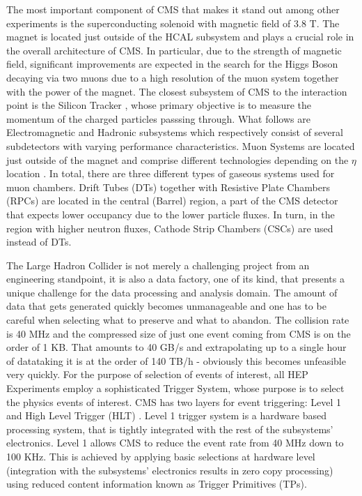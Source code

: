 The most important component of CMS that makes it stand out among other experiments is the superconducting solenoid with magnetic field of 3.8 T. The magnet is located just outside of the HCAL subsystem and plays a crucial role in the overall architecture of CMS. In particular, due to the strength of magnetic field, significant improvements are expected in the search for the Higgs Boson decaying via two muons due to a high resolution of the muon system together with the power of the magnet. The closest subsystem of CMS to the interaction point is the Silicon Tracker \cite{Tracker}, whose primary objective is to measure the momentum of the charged particles passsing through. What follows are Electromagnetic \cite{ECAL} and Hadronic \cite{HCAL} subsystems which respectively consist of several subdetectors with varying performance characteristics. Muon Systems are located just outside of the magnet and comprise different technologies depending on the $\eta$ location \cite{Muon}. In total, there are three different types of gaseous systems used for muon chambers. Drift Tubes (DTs) together with Resistive Plate Chambers (RPCs) are located in the central (Barrel) region, a part of the CMS detector that expects lower occupancy due to the lower particle fluxes. In turn, in the region with higher neutron fluxes, Cathode Strip Chambers (CSCs) are used instead of DTs.

The Large Hadron Collider is not merely a challenging project from an engineering standpoint, it is also a data factory, one of its kind, that presents a unique challenge for the data processing and analysis domain. The amount of data that gets generated quickly becomes unmanageable and one has to be careful when selecting what to preserve and what to abandon. The collision rate is 40 MHz and the compressed size of just one event coming from CMS is on the order of 1 KB. That amounts to 40 GB/s and extrapolating up to a single hour of datataking it is at the order of 140 TB/h - obviously this becomes unfeasible very quickly. For the purpose of selection of events of interest, all HEP Experiments employ a sophisticated Trigger System, whose purpose is to select the physics events of interest. CMS has two layers for event triggering: Level 1 \cite{L1Trigger} and High Level Trigger (HLT) \cite{HLTrigger}. Level 1 trigger system is a hardware based processing system, that is tightly integrated with the rest of the subsystems' electronics. Level 1 allows CMS to reduce the event rate from 40 MHz down to 100 KHz. This is achieved by applying basic selections at hardware level (integration with the subsystems' electronics results in zero copy processing) using reduced content information known as Trigger Primitives (TPs).

